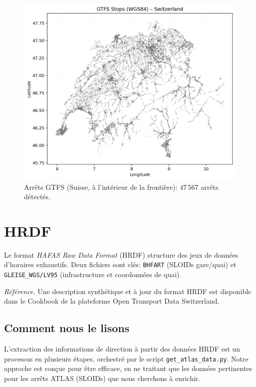 \begin{figure}[h]
  \centering
  \includegraphics[width=.76\linewidth]{figures/plots/gtfs_points_switzerland.png}
  \caption[Arrêts GTFS (Suisse)]{Arrêts GTFS (Suisse, à l'intérieur de la frontière): \(47\,567\) arrêts détectés.}
  \label{fig:gtfs_ch_points}
\end{figure}




\vspace{.2em}

\section{HRDF}
Le format \textit{HAFAS Raw Data Format} (HRDF) structure des jeux de données d'horaires exhaustifs. Deux fichiers sont clés: \texttt{BHFART} (SLOIDs gare/quai) et \texttt{GLEISE\_WGS/LV95} (infrastructure et coordonnées de quai).

\noindent\textit{Référence.} Une description synthétique et à jour du format HRDF est disponible dans le Cookbook de la plateforme Open Transport Data Switzerland.

\subsection{Comment nous le lisons}
L'extraction des informations de direction à partir des données HRDF est un processus en plusieurs étapes, orchestré par le script \texttt{get\_atlas\_data.py}. Notre approche est conçue pour être efficace, en ne traitant que les données pertinentes pour les arrêts ATLAS (SLOIDs) que nous cherchons à enrichir.

